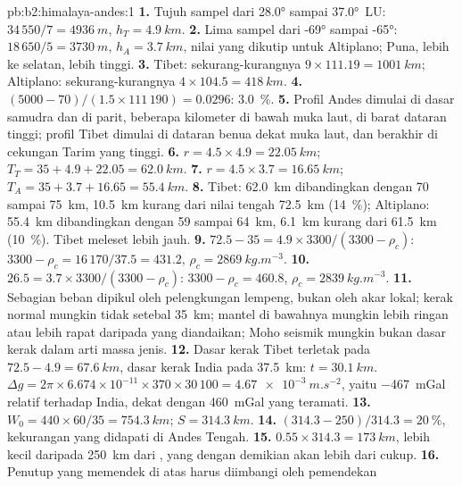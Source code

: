 \begin{solution}{pb:b2:himalaya-andes:1}
\textbf{1.} Tujuh sampel dari \ang{28.0} sampai \ang{37.0}~LU: $34\,550/7 = \qty{4936}{m}$, $h_T
= \qty{4.9}{km}$.
\textbf{2.} Lima sampel dari \ang{-69} sampai \ang{-65}: $18\,650/5 = \qty{3730}{m}$, $h_A =
\qty{3.7}{km}$, nilai yang dikutip untuk Altiplano; Puna, lebih ke selatan, lebih tinggi.
\textbf{3.} Tibet: sekurang-kurangnya $9\times111.19 = \qty{1001}{km}$; Altiplano: sekurang-kurangnya $4\times
104.5 = \qty{418}{km}$.
\textbf{4.} $(5000 - 70)/(1.5\times111\,190) = 0.0296$: \qty{3.0}{\percent}.
\textbf{5.} Profil Andes dimulai di dasar samudra dan di parit, beberapa kilometer di bawah
muka laut, di barat dataran tinggi; profil Tibet dimulai di dataran benua dekat muka laut,
dan berakhir di cekungan Tarim yang tinggi.
\textbf{6.} $r = 4.5\times4.9 = \qty{22.05}{km}$; $T_T = 35 + 4.9 + 22.05 = \qty{62.0}{km}$.
\textbf{7.} $r = 4.5\times3.7 = \qty{16.65}{km}$; $T_A = 35 + 3.7 + 16.65 = \qty{55.4}{km}$.
\textbf{8.} Tibet: \qty{62.0}{km} dibandingkan dengan 70 sampai \qty{75}{km}, \qty{10.5}{km} kurang dari nilai
tengah \qty{72.5}{km} (\qty{14}{\percent}); Altiplano: \qty{55.4}{km} dibandingkan dengan 59 sampai
\qty{64}{km}, \qty{6.1}{km} kurang dari \qty{61.5}{km} (\qty{10}{\percent}). Tibet meleset lebih jauh.
\textbf{9.} $72.5 - 35 = 4.9\times3300/(3300 - \rho_c)$: $3300 - \rho_c = 16\,170/37.5 =
431.2$, $\rho_c = \qty{2869}{kg.m^{-3}}$.
\textbf{10.} $26.5 = 3.7\times3300/(3300 - \rho_c)$: $3300 - \rho_c = 460.8$, $\rho_c =
\qty{2839}{kg.m^{-3}}$.
\textbf{11.} Sebagian beban dipikul oleh pelengkungan lempeng, bukan oleh akar lokal;
kerak normal mungkin tidak setebal \qty{35}{km}; mantel di bawahnya mungkin lebih ringan atau lebih rapat
daripada yang diandaikan; Moho seismik mungkin bukan dasar kerak dalam arti massa jenis.
\textbf{12.} Dasar kerak Tibet terletak pada $72.5 - 4.9 = \qty{67.6}{km}$, dasar kerak India pada
\qty{37.5}{km}: $t = \qty{30.1}{km}$. $\Delta g = 2\pi\times6.674\times10^{-11}\times370\times
30\,100 = \qty{4.67e-3}{m.s^{-2}}$, yaitu \qty{-467}{mGal} relatif terhadap India, dekat dengan
\qty{460}{mGal} yang teramati.
\textbf{13.} $W_0 = 440\times60/35 = \qty{754.3}{km}$; $S = \qty{314.3}{km}$.
\textbf{14.} $(314.3 - 250)/314.3 = \qty{20}{\percent}$, kekurangan yang didapati di Andes
Tengah.
\textbf{15.} $0.55\times314.3 = \qty{173}{km}$, lebih kecil daripada \qty{250}{km} dari , yang dengan demikian akan lebih dari cukup.
\textbf{16.} Penutup yang memendek di atas  harus diimbangi oleh pemendekan

\end{solution}
